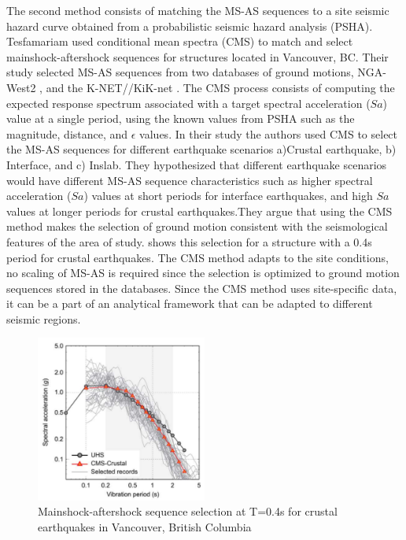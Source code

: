 The second method consists of matching the MS-AS sequences to a site seismic hazard curve obtained from a probabilistic seismic hazard analysis (PSHA). Tesfamariam \cite{Tesfamariam2015} used conditional mean spectra (CMS) to match and select mainshock-aftershock sequences for structures located in Vancouver, BC. Their study selected MS-AS sequences from two databases of ground motions, NGA-West2 \citep{Ancheta2014}, and the K-NET//KiK-net \cite{NIEDK-NETKiK-net2019}. The CMS process consists of computing the expected response spectrum associated with a target spectral acceleration ($Sa$) value at a single period, using the known values from PSHA such as the magnitude, distance, and $\epsilon$ values. In their study the authors used CMS to select the MS-AS sequences for different earthquake scenarios a)Crustal earthquake, b) Interface, and c) Inslab. They hypothesized that different earthquake scenarios would have different MS-AS sequence characteristics such as higher spectral acceleration ($Sa$) values at short periods for interface earthquakes, and high $Sa$ values at longer periods for crustal earthquakes.They argue that using the CMS method makes the selection of ground motion consistent with the seismological features of the area of study.  shows this selection for a structure with a 0.4s period for crustal earthquakes. The CMS method adapts to the site conditions, no scaling of MS-AS is required since the selection is optimized to ground motion sequences stored in the databases. Since the CMS method uses site-specific data, it can be a part of an analytical framework that can be adapted to different seismic regions.
\begin{figure}[htbp]
\centering
\includegraphics[width=0.5\textwidth]{Chapter-2/figs/CMS-Tesfamariam_MS-AS_seq}
\caption{Mainshock-aftershock sequence selection at T=0.4s for crustal earthquakes in Vancouver, British Columbia \cite{Tesfamariam2015}}
\label{fig:MS-AS_Goda}
\end{figure}

